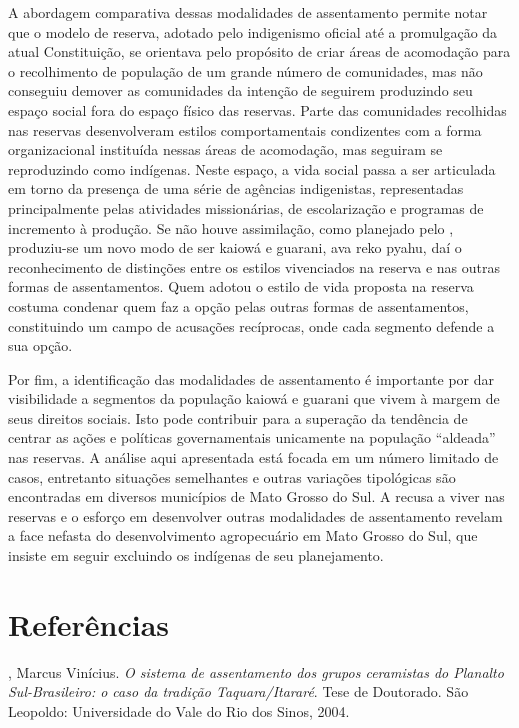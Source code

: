 {{A abordagem comparativa dessas modalidades de assentamento permite notar
que o modelo de reserva, adotado pelo indigenismo oficial até a
promulgação da atual Constituição, se orientava pelo propósito de criar
áreas de acomodação para o recolhimento de população de um grande
número de comunidades, mas não conseguiu demover as comunidades da
intenção de seguirem produzindo seu espaço social fora do espaço físico
das reservas. Parte das comunidades recolhidas nas reservas
desenvolveram estilos comportamentais condizentes com a forma
organizacional instituída nessas áreas de acomodação, mas seguiram se
reproduzindo como indígenas. Neste espaço, a vida social passa a ser
articulada em torno da presença de uma série de agências indigenistas,
representadas principalmente pelas atividades missionárias, de
escolarização e programas de incremento à produção. Se não houve
assimilação, como planejado pelo , produziu-se um novo modo de ser
kaiowá e guarani, ava reko pyahu, daí o reconhecimento de distinções
entre os estilos vivenciados na reserva e nas outras formas de
assentamentos. Quem adotou o estilo de vida proposta na reserva costuma
condenar quem faz a opção pelas outras formas de assentamentos,
constituindo um campo de acusações recíprocas, onde cada segmento
defende a sua opção.

Por fim, a identificação das modalidades de assentamento é importante
por dar visibilidade a segmentos da população kaiowá e guarani que
vivem à margem de seus direitos sociais. Isto pode contribuir para a
superação da tendência de centrar as ações e políticas governamentais
unicamente na população ``aldeada'' nas reservas. A análise aqui
apresentada está focada em um número limitado de casos, entretanto
situações semelhantes e outras variações tipológicas são encontradas em
diversos municípios de Mato Grosso do Sul. A recusa a viver nas
reservas e o esforço em desenvolver outras modalidades de assentamento
revelam a face nefasta do desenvolvimento agropecuário em Mato Grosso
do Sul, que insiste em seguir excluindo os indígenas de seu
planejamento.

\section{Referências}

\begin{Parskip}
, Marcus Vinícius. \emph{O sistema de assentamento dos grupos ceramistas
do Planalto Sul-Brasileiro: o caso da tradição Taquara/Itararé}. Tese de
Doutorado. São Leopoldo: Universidade do Vale do Rio dos Sinos, 2004.


\end{Parskip}}}
